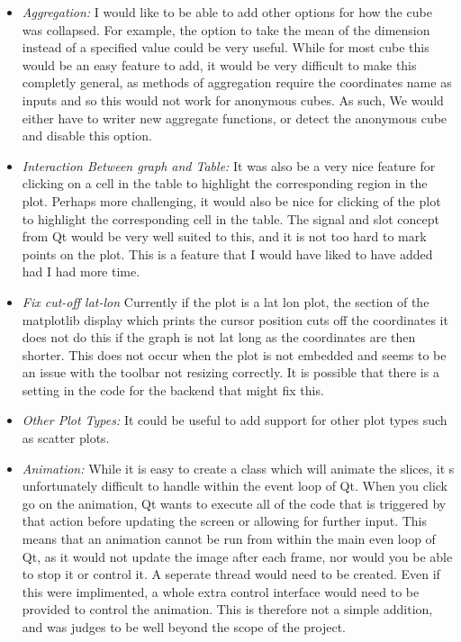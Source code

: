 \documentclass[whitecover]{MO_report}
\begin{document}
\begin{itemize}

\item
\emph{Aggregation:} I would like to be able to add other options for how the
cube was collapsed. For example, the option to take the mean of the dimension
instead of a specified value could be very useful. While for most cube this
would be an easy feature to add, it would be very difficult to make this
completly general, as methods of aggregation require the coordinates name as
inputs and so this would not work for anonymous cubes. As such, We would either
have to writer new aggregate functions, or detect the anonymous cube and
disable this option.

\item
\emph{Interaction Between graph and Table:} It was also be a very nice feature
for clicking on a cell in the table to highlight the corresponding region
in the plot. Perhaps more challenging, it would also be nice for clicking of the
plot to highlight the corresponding cell in the table. The signal and slot
concept from Qt would be very well suited to this, and it is not too hard to
mark points on the plot. This is a feature that I would have liked to have
added had I had more time.

\item
\emph{Fix cut-off lat-lon} Currently if the plot is a lat lon plot, the section
of the matplotlib display which prints the cursor position cuts off the
coordinates it does not do this if the graph is not lat long as the coordinates
are then shorter. This does not occur when the plot is not embedded and seems
to be an issue with the toolbar not resizing correctly. It is possible that
there is a setting in the code for the backend that might fix this.

\item
\emph{Other Plot Types:} It could be useful to add support for other plot types
such as scatter plots.

\item
\emph{Animation:} While it is easy to create a class which will animate the
slices, it s unfortunately difficult to handle within the event loop of Qt.
When you click go on the animation, Qt wants to execute all of the code that is
triggered by that action before updating the screen or allowing for further
input. This means that an animation cannot be run from within the main even
loop of Qt, as it would not update the image after each frame, nor would you
be able to stop it or control it. A seperate thread would need to be created.
Even if this were implimented, a whole extra control interface would need to be
provided to control the animation. This is therefore not a simple addition, and
was judges to be well beyond the scope of the project.


\end{itemize}
\end{document}
